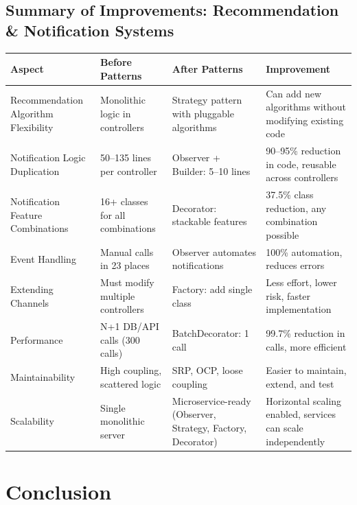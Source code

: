 \documentclass[a4paper,12pt]{report}
\begin{document}
\subsection*{Summary of Improvements: Recommendation \& Notification Systems}

\begin{center}
\begin{tabular}{|p{3cm}|p{3.5cm}|p{3.5cm}|p{4cm}|}
\hline
\textbf{Aspect} & \textbf{Before Patterns} & \textbf{After Patterns} & \textbf{Improvement} \\ \hline
Recommendation Algorithm Flexibility & Monolithic logic in controllers & Strategy pattern with pluggable algorithms & Can add new algorithms without modifying existing code \\ \hline
Notification Logic Duplication & 50--135 lines per controller & Observer + Builder: 5--10 lines & 90--95\% reduction in code, reusable across controllers \\ \hline
Notification Feature Combinations & 16+ classes for all combinations & Decorator: stackable features & 37.5\% class reduction, any combination possible \\ \hline
Event Handling & Manual calls in 23 places & Observer automates notifications & 100\% automation, reduces errors \\ \hline
Extending Channels & Must modify multiple controllers & Factory: add single class & Less effort, lower risk, faster implementation \\ \hline
Performance & N+1 DB/API calls (300 calls) & BatchDecorator: 1 call & 99.7\% reduction in calls, more efficient \\ \hline
Maintainability & High coupling, scattered logic & SRP, OCP, loose coupling & Easier to maintain, extend, and test \\ \hline
Scalability & Single monolithic server & Microservice-ready (Observer, Strategy, Factory, Decorator) & Horizontal scaling enabled, services can scale independently \\ \hline
\end{tabular}
\end{center}



\section{Conclusion}
\end{document}
